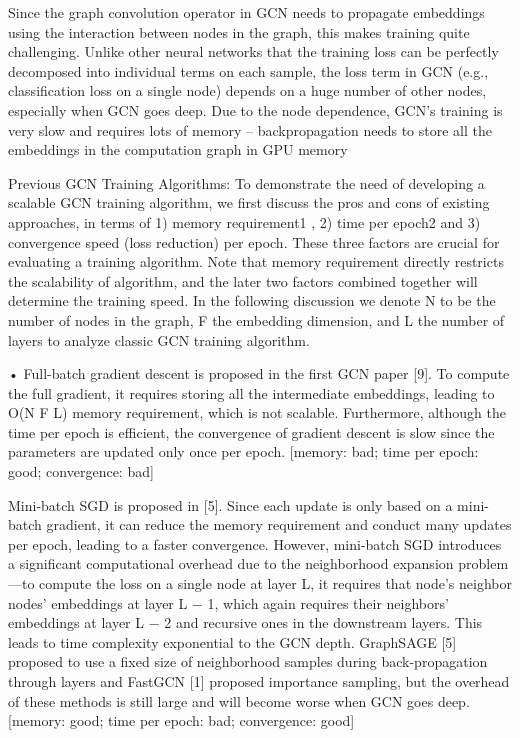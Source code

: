 \documentclass[
]{book}
\begin{document}
{{{Since the graph convolution operator in GCN needs to propagate embeddings using the interaction between nodes in the graph, this makes training quite challenging. Unlike other neural networks that the training loss can be perfectly decomposed into individual terms on each sample, the loss term in GCN (e.g., classification loss on a single node) depends on a huge number of other nodes, especially when GCN goes deep. Due to the node dependence, GCN's training is very slow and requires lots of memory -- backpropagation needs to store all the embeddings in the computation graph in GPU memory

Previous GCN Training Algorithms: To demonstrate the need of developing a scalable GCN training algorithm, we first discuss the pros and cons of existing approaches, in terms of 1) memory requirement1 , 2) time per epoch2 and 3) convergence speed (loss reduction) per epoch. These three factors are crucial for evaluating a training algorithm. Note that memory requirement directly restricts the scalability of algorithm, and the later two factors combined together will determine the training speed. In the following discussion we denote N to be the number of nodes in the graph, F the embedding dimension, and L the number of layers to analyze classic GCN training algorithm.

• Full-batch gradient descent is proposed in the first GCN paper {[}9{]}. To compute the full gradient, it requires storing all the intermediate embeddings, leading to O(N F L) memory requirement, which is not scalable. Furthermore, although the time per epoch is efficient, the convergence of gradient descent is slow since the parameters are updated only once per epoch. {[}memory: bad; time per epoch: good; convergence: bad{]}

Mini-batch SGD is proposed in {[}5{]}. Since each update is only based on a mini-batch gradient, it can reduce the memory requirement and conduct many updates per epoch, leading to a faster convergence. However, mini-batch SGD introduces a significant computational overhead due to the neighborhood expansion problem---to compute the loss on a single node at layer L, it requires that node's neighbor nodes' embeddings at layer L − 1, which again requires their neighbors' embeddings at layer L − 2 and recursive ones in the downstream layers. This leads to time complexity exponential to the GCN depth. GraphSAGE {[}5{]} proposed to use a fixed size of neighborhood samples during back-propagation through layers and FastGCN {[}1{]} proposed importance sampling, but the overhead of these methods is still large and will become worse when GCN goes deep. {[}memory: good; time per epoch: bad; convergence: good{]}

}}}
\end{document}
